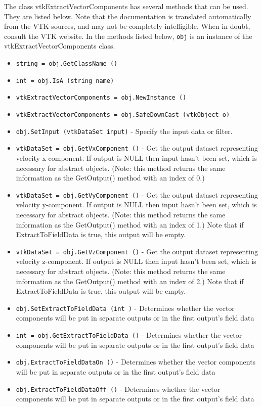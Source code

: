 The class vtkExtractVectorComponents has several methods that can be used.
  They are listed below.
Note that the documentation is translated automatically from the VTK sources,
and may not be completely intelligible.  When in doubt, consult the VTK website.
In the methods listed below, \verb|obj| is an instance of the vtkExtractVectorComponents class.
\begin{itemize}
\item  \verb|string = obj.GetClassName ()|

\item  \verb|int = obj.IsA (string name)|

\item  \verb|vtkExtractVectorComponents = obj.NewInstance ()|

\item  \verb|vtkExtractVectorComponents = obj.SafeDownCast (vtkObject o)|

\item  \verb|obj.SetInput (vtkDataSet input)| -  Specify the input data or filter.

\item  \verb|vtkDataSet = obj.GetVxComponent ()| -  Get the output dataset representing velocity x-component. If output is
 NULL then input hasn't been set, which is necessary for abstract
 objects. (Note: this method returns the same information as the
 GetOutput() method with an index of 0.)

\item  \verb|vtkDataSet = obj.GetVyComponent ()| -  Get the output dataset representing velocity y-component. If output is
 NULL then input hasn't been set, which is necessary for abstract
 objects. (Note: this method returns the same information as the
 GetOutput() method with an index of 1.)
 Note that if ExtractToFieldData is true, this output will be empty.

\item  \verb|vtkDataSet = obj.GetVzComponent ()| -  Get the output dataset representing velocity z-component. If output is
 NULL then input hasn't been set, which is necessary for abstract
 objects. (Note: this method returns the same information as the
 GetOutput() method with an index of 2.)
 Note that if ExtractToFieldData is true, this output will be empty.

\item  \verb|obj.SetExtractToFieldData (int )| -  Determines whether the vector components will be put
 in separate outputs or in the first output's field data

\item  \verb|int = obj.GetExtractToFieldData ()| -  Determines whether the vector components will be put
 in separate outputs or in the first output's field data

\item  \verb|obj.ExtractToFieldDataOn ()| -  Determines whether the vector components will be put
 in separate outputs or in the first output's field data

\item  \verb|obj.ExtractToFieldDataOff ()| -  Determines whether the vector components will be put
 in separate outputs or in the first output's field data

\end{itemize}
